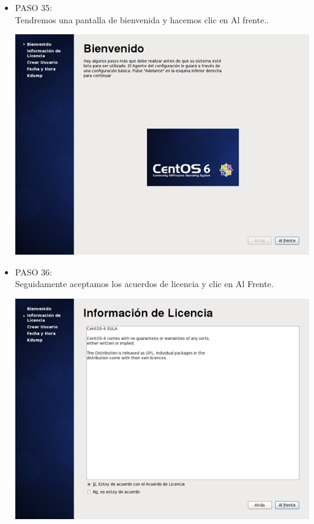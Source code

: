\begin{itemize}
\item PASO 35:
\\Tendremos una pantalla de bienvenida  y hacemos clic en Al frente..
		\begin{center}
		\includegraphics[width=13cm]{./Imagenes/35}
		\end{center}
	
	\end{itemize} 

\begin{itemize}
\item PASO 36:
\\Seguidamente aceptamos los acuerdos de licencia  y clic en Al Frente.
		\begin{center}
		\includegraphics[width=13cm]{./Imagenes/36}
		\end{center}
	\\\
	\end{itemize} 

